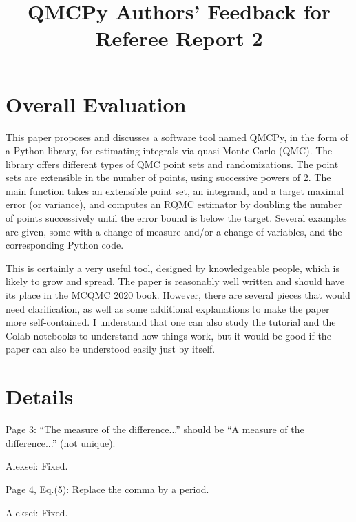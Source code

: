 \documentclass{amsart}
\begin{document}
\title{QMCPy Authors' Feedback for Referee Report 2}

\newcommand{\AGSComment}[1]{{\color{cyan} Aleksei: #1}}
\newcommand{\FJHComment}[1]{{\color{blue} Fred: #1}}

\maketitle


\section{Overall Evaluation}

This paper proposes and discusses a software tool named QMCPy, in the form of a Python library, for estimating integrals via quasi-Monte Carlo (QMC). The library offers different types of QMC point sets and randomizations. The point sets are extensible in the number of points, using successive powers of 2. The main function takes an extensible point set, an integrand, and a target maximal error (or variance), and computes an RQMC estimator by doubling the number of points successively until the error bound is below the target. Several examples are given, some with a change of measure and/or a change of variables, and the corresponding Python code.

This is certainly a very useful tool, designed by knowledgeable people, which is likely to grow and spread. The paper is reasonably well written and should have its place in the MCQMC 2020 book. However, there are several pieces that would need clarification, as well as some additional explanations to make the paper more self-contained. I understand that one can also study the tutorial and the Colab notebooks to understand how things work, but it would be good if the paper can also be understood easily just by itself.

\section{Details}

Page 3: ``The measure of the difference...'' should be ``A measure of the difference...'' (not
unique).

\AGSComment{Fixed.}
\vspace{1cm}

Page 4, Eq.(5): Replace the comma by a period.

\AGSComment{Fixed.}
\vspace{1cm}
\end{document}
